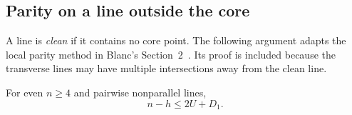\subsection{Parity on a line outside the core}

A line is \emph{clean} if it contains no core point. The following argument adapts the local parity method in Blanc's Section~2~\citep{blanc2011}. Its proof is included because the transverse lines may have multiple intersections away from the clean line.

\begin{lemma}
\label{upper:clean-charge}
For even $n\ge4$ and pairwise nonparallel lines,
\begin{equation}
 n-h\le2U+D_1.
 \label{upper:charging}
\end{equation}
\end{lemma}

